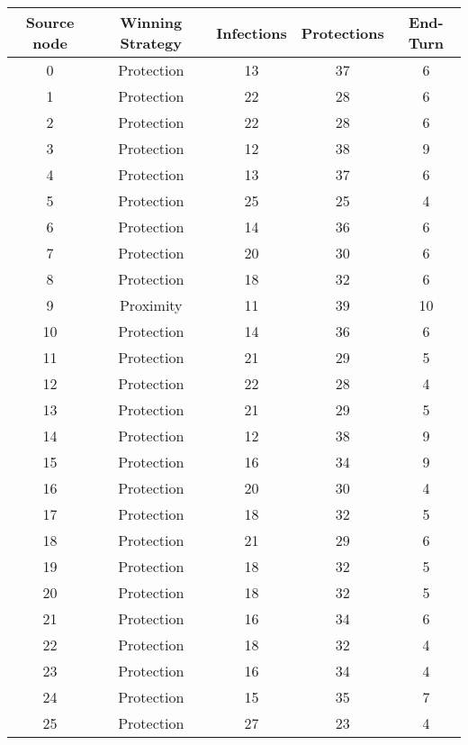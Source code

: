 \documentclass[results.tex]{subfiles}
\begin{document}
\begin{center}
  \begin{tabular}{| c || c | c | c | c |}
    \hline
    {\bfseries Source node} & {\bfseries Winning Strategy} & {\bfseries Infections} & {\bfseries Protections} & {\bfseries End-Turn} \\  %
    \hline\hline
    0 & Protection & 13 & 37 & 6 \\ 
    \hline
    1 & Protection & 22 & 28 & 6 \\ 
    \hline
    2 & Protection & 22 & 28 & 6 \\ 
    \hline
    3 & Protection & 12 & 38 & 9 \\ 
    \hline
    4 & Protection & 13 & 37 & 6 \\ 
    \hline
    5 & Protection & 25 & 25 & 4 \\ 
    \hline
    6 & Protection & 14 & 36 & 6 \\ 
    \hline
    7 & Protection & 20 & 30 & 6 \\ 
    \hline
    8 & Protection & 18 & 32 & 6 \\ 
    \hline
    9 & Proximity & 11 & 39 & 10 \\ 
    \hline
    10 & Protection & 14 & 36 & 6 \\ 
    \hline
    11 & Protection & 21 & 29 & 5 \\ 
    \hline
    12 & Protection & 22 & 28 & 4 \\ 
    \hline
    13 & Protection & 21 & 29 & 5 \\ 
    \hline
    14 & Protection & 12 & 38 & 9 \\ 
    \hline
    15 & Protection & 16 & 34 & 9 \\ 
    \hline
    16 & Protection & 20 & 30 & 4 \\ 
    \hline
    17 & Protection & 18 & 32 & 5 \\ 
    \hline
    18 & Protection & 21 & 29 & 6 \\ 
    \hline
    19 & Protection & 18 & 32 & 5 \\ 
    \hline
    20 & Protection & 18 & 32 & 5 \\ 
    \hline
    21 & Protection & 16 & 34 & 6 \\ 
    \hline
    22 & Protection & 18 & 32 & 4 \\ 
    \hline
    23 & Protection & 16 & 34 & 4 \\ 
    \hline
    24 & Protection & 15 & 35 & 7 \\ 
    \hline
    25 & Protection & 27 & 23 & 4 \\ 

\end{tabular}
\end{center}
\end{document}
